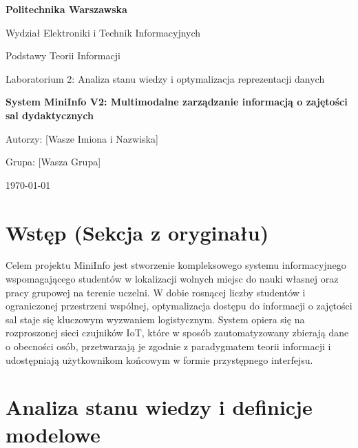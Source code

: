 \documentclass[12pt,a4paper]{article}
\begin{document}
\begin{titlepage}
    \centering
    \vspace*{2cm}
    {\huge\textbf{Politechnika Warszawska}\par}
    \vspace{1cm}
    {\Large Wydział Elektroniki i Technik Informacyjnych\par}
    \vspace{2cm}
    {\Large Podstawy Teorii Informacji}\par
    \vspace{0.5cm}
    {\large Laboratorium 2: Analiza stanu wiedzy i optymalizacja reprezentacji danych\par}
    \vspace{2.5cm}
    {\Huge\textbf{System MiniInfo V2: Multimodalne zarządzanie informacją o zajętości sal dydaktycznych}\par}
    \vfill
    {\large Autorzy: [Wasze Imiona i Nazwiska]}\par
    {\large Grupa: [Wasza Grupa]}\par
    \vspace{1cm}
    {\large \today}
\end{titlepage}

\newpage
\tableofcontents
\newpage

\section{Wstęp (Sekcja z oryginału)}
Celem projektu MiniInfo jest stworzenie kompleksowego systemu informacyjnego wspomagającego studentów w lokalizacji wolnych miejsc do nauki własnej oraz pracy grupowej na terenie uczelni. W dobie rosnącej liczby studentów i ograniczonej przestrzeni wspólnej, optymalizacja dostępu do informacji o zajętości sal staje się kluczowym wyzwaniem logistycznym. System opiera się na rozproszonej sieci czujników IoT, które w sposób zautomatyzowany zbierają dane o obecności osób, przetwarzają je zgodnie z paradygmatem teorii informacji i udostępniają użytkownikom końcowym w formie przystępnego interfejsu.

\section{Analiza stanu wiedzy i definicje modelowe}
\end{document}
